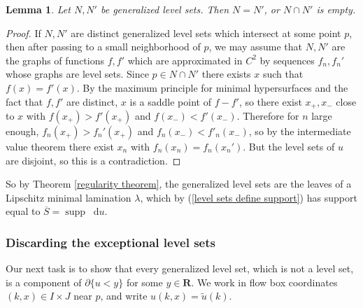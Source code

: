 \documentclass[reqno,11pt]{amsart}
\newcommand{\RR}{\mathbf{R}}
\newcommand*\dif{\mathop{}\!\mathrm{d}}
\DeclareMathOperator{\supp}{supp}
\newtheorem{lemma}[theorem]{Lemma}
\theoremstyle{definition}
\numberwithin{equation}{section}
\begin{document}
\begin{lemma}
Let $N, N'$ be generalized level sets.
Then $N = N'$, or $N \cap N'$ is empty.
\end{lemma}
\begin{proof}
If $N, N'$ are distinct generalized level sets which intersect at some point $p$, then after passing to a small neighborhood of $p$, we may assume that $N, N'$ are the graphs of functions $f, f'$ which are approximated in $C^2$ by sequences $f_n, f_n'$ whose graphs are level sets.
Since $p \in N \cap N'$ there exists $x$ such that $f(x) = f'(x)$.
By the maximum principle for minimal hypersurfaces and the fact that $f, f'$ are distinct, $x$ is a saddle point of $f - f'$, so there exist $x_+, x_-$ close to $x$ with $f(x_+) > f'(x_+)$ and $f(x_-) < f'(x_-)$.
Therefore for $n$ large enough, $f_n(x_+) > f_n'(x_+)$ and $f_n(x_-) < f'_n(x_-)$, so by the intermediate value theorem there exist $x_n$ with $f_n(x_n) = f_n(x_n')$.
But the level sets of $u$ are disjoint, so this is a contradiction.
\end{proof}

So by Theorem \ref{regularity theorem}, the generalized level sets are the leaves of a Lipschitz minimal lamination $\lambda$, which by (\ref{level sets define support}) has support equal to $\overline S = \supp \dif u$.

\subsubsection{Discarding the exceptional level sets}
Our next task is to show that every generalized level set, which is not a level set, is a component of $\partial \{u < y\}$ for some $y \in \RR$.
We work in flow box coordinates $(k, x) \in I \times J$ near $p$, and write $u(k, x) = \tilde u(k)$.
\end{document}

